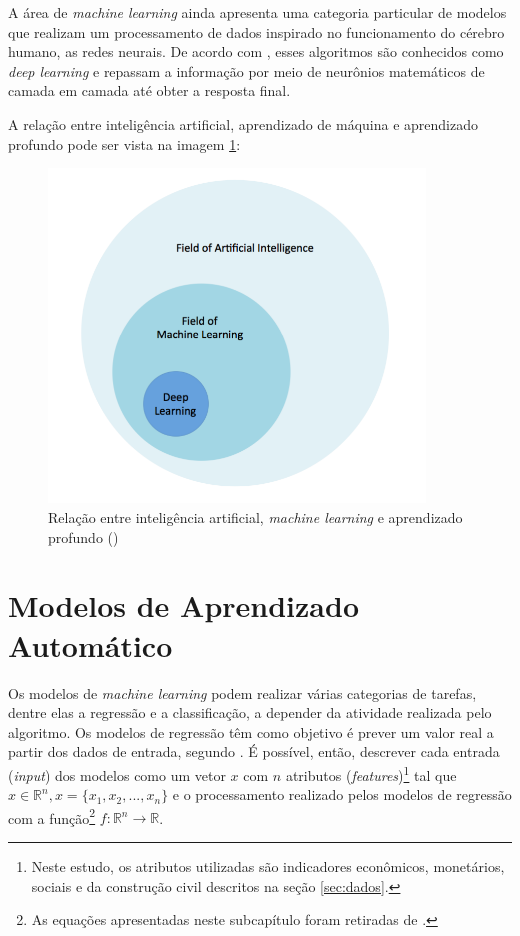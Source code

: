 A área de \textit{machine learning} ainda apresenta uma categoria particular de modelos que realizam um processamento de dados inspirado no 
funcionamento do cérebro humano, as redes neurais. De acordo com 
\citet{deeplearningbook}, esses algoritmos são conhecidos como \textit{deep learning} e repassam a informação por meio de neurônios matemáticos de camada em camada até obter a resposta final.


A relação entre inteligência artificial, aprendizado de 
máquina e aprendizado profundo pode ser vista na 
imagem \ref{fig:ia_ml}:

\begin{figure}[H] 
  \includegraphics[width= 10cm]{../figuras/ia_ml.png}
  \caption{Relação entre inteligência artificial, \textit{machine learning} e aprendizado profundo (\citealt[][p.4]{dl-oreilly})}
  \label{fig:ia_ml}
\end{figure}

\section{Modelos de Aprendizado Automático}
 
Os modelos de \textit{machine learning} podem realizar várias categorias 
de tarefas, dentre elas a regressão e a classificação, a 
depender da atividade realizada pelo algoritmo. Os modelos de regressão têm como objetivo é prever um valor real a 
partir dos dados de entrada, segundo \citet{Goodfellow-et-al-2016}.
É possível, então, descrever cada entrada (\textit{input}) dos modelos como um vetor $x$ com 
$n$ atributos (\textit{features})\footnote{Neste estudo, 
os atributos utilizadas são indicadores econômicos, monetários,
sociais e da construção civil descritos na seção \ref{sec:dados}.} tal que
$x \in \mathbb{R}^n , x=\{x_1, x_2, ..., x_n\}$ e o 
processamento realizado pelos modelos de regressão com a função\footnote{As equações apresentadas neste subcapítulo foram retiradas de \cite{Goodfellow-et-al-2016}.} $ f : \mathbb{R}^n \rightarrow \mathbb{R}$. 

